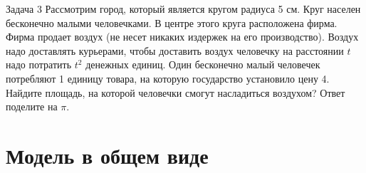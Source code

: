 \begin{mybox}{Задача 3}
    \indent\setlength{\parindent}{1em}\indent\setlength{\parindent}{1em}Рассмотрим город, который является кругом
    радиуса 5 см. Круг населен бесконечно малыми человечками. В центре этого круга расположена фирма. Фирма продает
    воздух (не несет никаких издержек на его производство). Воздух надо доставлять курьерами, чтобы доставить воздух
    человечку на расстоянии $t$ надо потратить $t^2$ денежных единиц. Один бесконечно малый человечек
    потребляют 1 единицу товара, на которую государство установило цену 4. Найдите площадь, на которой человечки
    смогут насладиться воздухом? Ответ поделите на $\pi$.
\end{mybox}


\section{Модель в общем виде}

